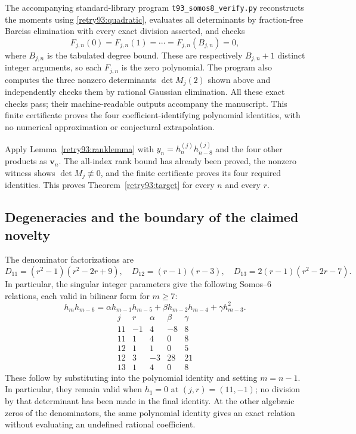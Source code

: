 \documentclass[11pt,a4paper]{article}
\theoremstyle{definition}
\theoremstyle{remark}
\begin{document}
The accompanying standard-library program
\texttt{t93\_somos8\_verify.py} reconstructs the moments using
\eqref{retry93:quadratic}, evaluates all determinants by fraction-free
Bareiss elimination with every exact division asserted, and checks
\[
 F_{j,n}(0)=F_{j,n}(1)=\cdots=F_{j,n}(B_{j,n})=0,
\]
where $B_{j,n}$ is the tabulated degree bound. These are respectively
$B_{j,n}+1$ distinct integer arguments, so each $F_{j,n}$ is the zero
polynomial. The program also computes the three nonzero determinants
$\det M_j(2)$ shown above and independently checks them by rational
Gaussian elimination. All these exact checks pass; their machine-readable
outputs accompany the manuscript. This finite certificate proves the four
coefficient-identifying polynomial identities, with no numerical
approximation or conjectural extrapolation.

Apply Lemma~\ref{retry93:ranklemma} with
$y_n=h_n^{(j)}h_{n-8}^{(j)}$ and the four other products as
$\mathbf v_n$. The all-index rank bound has already been proved, the
nonzero witness shows $\det M_j\not\equiv0$, and the finite certificate
proves its four required identities. This proves
Theorem~\ref{retry93:target} for every $n$ and every $r$.

\subsection{Degeneracies and the boundary of the claimed novelty}
The denominator factorizations are
\[
 D_{11}=(r^2-1)(r^2-2r+9),\quad
 D_{12}=(r-1)(r-3),\quad
 D_{13}=2(r-1)(r^2-2r-7).
\]
In particular, the singular integer parameters give the following
Somos--6 relations, each valid in bilinear form for $m\ge7$:
\[
 h_mh_{m-6}=\alpha h_{m-1}h_{m-5}
             +\beta h_{m-2}h_{m-4}+\gamma h_{m-3}^2.
\]
\[
\begin{array}{c|r|rrr}
j&r&\alpha&\beta&\gamma\\\hline
11&-1&4&-8&8\\
11&1&4&0&8\\
12&1&1&0&5\\
12&3&-3&28&21\\
13&1&4&0&8
\end{array}
\]
These follow by substituting into the polynomial identity and setting
$m=n-1$. In particular, they remain valid when $h_1=0$ at $(j,r)=(11,-1)$;
no division by that determinant has been made in the final identity.
At the other algebraic zeros of the denominators, the same polynomial
identity gives an exact relation without evaluating an undefined rational
coefficient.
\end{document}
